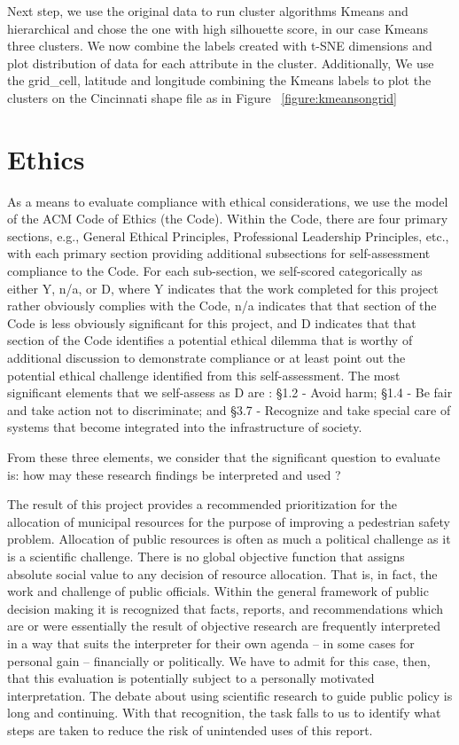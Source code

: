 \documentclass{llncs}
\begin{document}
Next step, we use the original data to run cluster algorithms Kmeans and hierarchical and chose the one with high silhouette score, in our case Kmeans three clusters. We now combine the labels created with t-SNE dimensions and plot distribution of data for each attribute in the cluster. Additionally, We use the grid_cell, latitude and longitude combining the Kmeans labels to plot the clusters on the Cincinnati shape file as in Figure ~\ref{figure:kmeansongrid}


%
\section{Ethics}
%
As a means to evaluate compliance with ethical considerations, we use the model of the ACM Code of Ethics  (the Code). Within the Code, there are four primary sections, e.g., General Ethical Principles, Professional Leadership Principles, etc., with each primary section providing additional subsections for self-assessment compliance to the Code. For each sub-section, we self-scored categorically as either Y, n/a, or D, where Y indicates that the work completed for this project rather obviously complies with the Code, n/a indicates that that section of the Code is less obviously significant for this project, and D indicates that that section of the Code identifies a potential ethical dilemma that is worthy of additional discussion to demonstrate compliance or at least point out the potential ethical challenge identified from this self-assessment.
The most significant elements that we self-assess as D are : \S 1.2 - Avoid harm; \S 1.4 - Be fair and take action not to discriminate; and \S 3.7 - Recognize and take special care of systems that become integrated into the infrastructure of society.

From these three elements, we consider that the significant question to evaluate is: how may these research findings be interpreted and used ?

The result of this project provides a recommended prioritization for the allocation of municipal resources for the purpose of improving a pedestrian safety problem. Allocation of  public resources is often as much a political challenge as it is a scientific challenge. There is no global objective function that assigns absolute social value to any decision of resource allocation. That is, in fact, the work and challenge of public officials. Within the general framework of public decision making it is recognized that facts, reports, and recommendations which are or were essentially the result of objective research are frequently interpreted in a way that suits the interpreter for their own agenda – in some cases for personal gain – financially or politically. We have to admit for this case, then, that this evaluation is potentially subject to a personally motivated interpretation. The debate about using scientific research to guide public policy is long and continuing. With that recognition, the task falls to us to identify what steps are taken to reduce the risk of unintended uses of this report.
\end{document}
